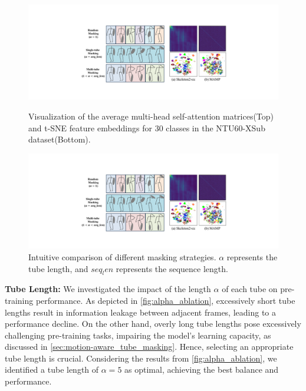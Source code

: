 \begin{figure}[tb]
    \centering
    \begin{minipage}[b]{0.48\linewidth}
        \centering
        \includegraphics[width=0.70\linewidth]{figures/fig_qualitative.pdf}
        \caption{
          Visualization of the average multi-head self-attention matrices(Top) and
          t-SNE feature embeddings for 30 classes in the NTU60-XSub dataset(Bottom).
        }
        \label{fig:qualitative}
    \end{minipage}\hfill
    \begin{minipage}[b]{0.49\linewidth}
        \centering
        \includegraphics[width=0.90\linewidth]{figures/fig_masking_cmp.pdf}
        \caption{
          Intuitive comparison of different masking strategies.
          $\alpha$ represents the tube length, and $seq_len$ represents the sequence length.
        }
        \label{fig:masking_cmp}
    \end{minipage}
    \vspace{-15pt}
\end{figure}

\noindent \textbf{Tube Length:}
We investigated the impact of the length $\alpha$ of each tube on pre-training performance.
As depicted in \cref{fig:alpha_ablation}, excessively short tube lengths result
in information leakage between adjacent frames, leading to a performance decline.
On the other hand, overly long tube lengths pose excessively challenging pre-training
tasks, impairing the model's learning capacity, as discussed in \cref{sec:motion-aware_tube_masking}.
Hence, selecting an appropriate tube length is crucial. Considering the results
from \cref{fig:alpha_ablation}, we identified a tube length of $\alpha=5$ as
optimal, achieving the best balance and performance.

